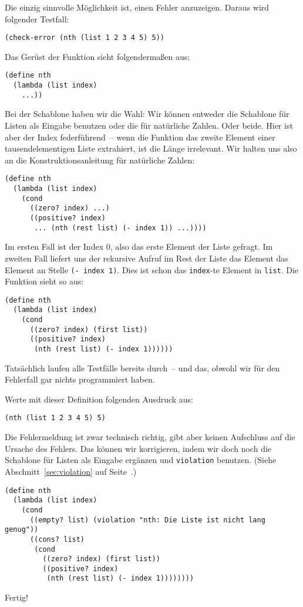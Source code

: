 Die einzig sinnvolle Möglichkeit ist, einen Fehler anzuzeigen.
Daraus wird folgender Testfall:
%
\begin{lstlisting}
(check-error (nth (list 1 2 3 4 5) 5))
\end{lstlisting}
%
Das Gerüst der Funktion sieht folgendermaßen aus:
%
\begin{lstlisting}
(define nth
  (lambda (list index)
    ...))
\end{lstlisting}
%
Bei der Schablone haben wir die Wahl: Wir können entweder die
Schablone für Listen als Eingabe benutzen oder die für natürliche
Zahlen.  Oder beide.  Hier ist aber der Index federführend~-- wenn die
Funktion das zweite Element einer tausendelementigen Liste extrahiert,
ist die Länge irrelevant.  Wir halten uns also an die
Konstruktionsanleitung für natürliche Zahlen:
%
\begin{lstlisting}
(define nth
  (lambda (list index)
    (cond
      ((zero? index) ...)
      ((positive? index)
       ... (nth (rest list) (- index 1)) ...))))
\end{lstlisting}
%
Im ersten Fall ist der Index 0, also das erste Element der Liste
gefragt.  Im zweiten Fall liefert uns der rekursive Aufruf im Rest der
Liste das Element das Element an Stelle \lstinline{(- index 1)}.  Dies
ist schon das \lstinline{index}-te Element in \lstinline{list}.  Die
Funktion sieht so aus:
%
\begin{lstlisting}
(define nth
  (lambda (list index)
    (cond
      ((zero? index) (first list))
      ((positive? index)
       (nth (rest list) (- index 1))))))
\end{lstlisting}
%
Tatsächlich laufen alle Testfälle bereits durch~-- und das, obwohl wir
für den Fehlerfall gar nichts programmiert haben.
\begin{aufgabe}
  Werte mit dieser Definition folgenden Ausdruck aus:
\begin{lstlisting}
(nth (list 1 2 3 4 5) 5)
\end{lstlisting}
\end{aufgabe}
%
Die Fehlermeldung ist zwar technisch richtig, gibt aber keinen
Aufschluss auf die Ursache des Fehlers.  Das können wir korrigieren,
indem wir doch noch die Schablone für Listen als Eingabe ergänzen und
\lstinline{violation} benutzen.  (Siehe Abschnitt~\ref{sec:violation} auf
Seite~\pageref{sec:violation}.)
%
\begin{lstlisting}
(define nth
  (lambda (list index)
    (cond
      ((empty? list) (violation "nth: Die Liste ist nicht lang genug"))
      ((cons? list)
       (cond
         ((zero? index) (first list))
         ((positive? index)
          (nth (rest list) (- index 1))))))))
\end{lstlisting}
%
Fertig!

